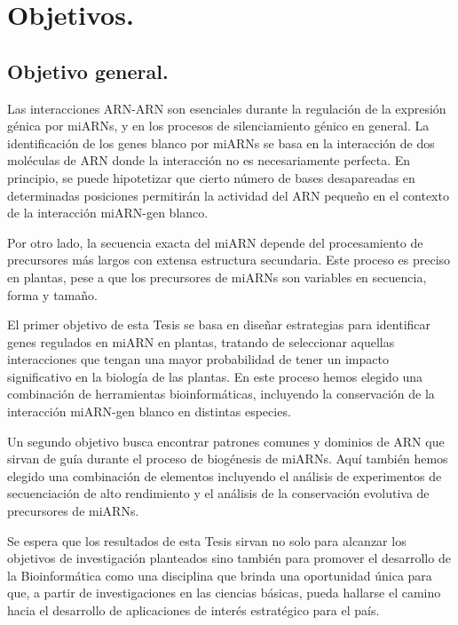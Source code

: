 \setcounter{chapter}{2}
\chapter*{Objetivos.} 
\setcounter{figure}{0}
\setcounter{table}{0}
\setcounter{section}{0}

\section{Objetivo general.} 

Las interacciones ARN-ARN son esenciales durante la regulación de la expresión génica por miARNs, y en los procesos de silenciamiento génico en general.
La identificación de los genes blanco por miARNs se basa en la interacción de dos moléculas de ARN donde la interacción no es necesariamente perfecta. 
En principio, se puede hipotetizar que cierto número de bases desapareadas en determinadas posiciones permitirán la actividad del ARN pequeño en el contexto de la interacción miARN-gen blanco. 

Por otro lado, la secuencia exacta del miARN depende del procesamiento de precursores más largos con extensa estructura secundaria.
Este proceso es preciso en plantas, pese a que los precursores de miARNs son variables en secuencia, forma y tamaño.

El primer objetivo de esta Tesis se basa en diseñar estrategias para identificar genes regulados en miARN en plantas, tratando de seleccionar aquellas interacciones que tengan una mayor probabilidad de tener un impacto significativo en la biología de las plantas.
En este proceso hemos elegido una combinación de herramientas bioinformáticas, incluyendo la conservación de la interacción miARN-gen blanco en distintas especies.

Un segundo objetivo busca encontrar patrones comunes y dominios de ARN que sirvan de guía durante el proceso de biogénesis de miARNs.
Aquí también hemos elegido una combinación de elementos incluyendo el análisis de experimentos de secuenciación de alto rendimiento y el análisis de la conservación evolutiva de precursores de miARNs.

Se espera que los resultados de esta Tesis sirvan no solo para alcanzar los objetivos de investigación planteados sino también para promover el desarrollo de la Bioinformática como una disciplina que brinda una oportunidad única para que, a partir de investigaciones en las ciencias básicas, pueda hallarse el camino hacia el desarrollo de aplicaciones de interés estratégico para el país.

